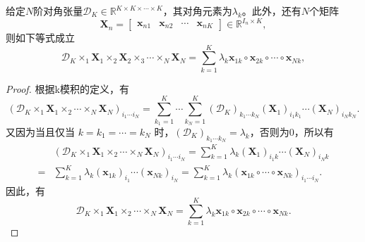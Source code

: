 \begin{property}\label{prop:diag-kron}
    给定\( N \)阶对角张量\( \mathcal{D}_K \in \mathbb{R}^{K \times K \times \cdots \times K} \)，其对角元素为\( \lambda_k \)。此外，还有\( N \)个矩阵
    \[
        \mathbf{X}_n = \begin{bmatrix}
            \bm{x}_{n1} & \bm{x}_{n2} & \cdots & \bm{x}_{nK}
        \end{bmatrix} \in \mathbb{R}^{I_n \times K},
    \]
    则如下等式成立
    \[
        \mathcal{D}_K \times_1 \mathbf{X}_1 \times_2 \mathbf{X}_2 \times_3 \cdots \times_N \mathbf{X}_N = \sum_{k=1}^K \lambda_k \bm{x}_{1k} \circ \bm{x}_{2k} \circ \cdots \circ \bm{x}_{Nk},
    \]
\end{property}
\begin{proof}
    根据k模积的定义，有
    \[
        \left( \mathcal{D}_K \times_1 \mathbf{X}_1 \times_2 \cdots \times_N \mathbf{X}_N \right)_{i_1 \cdots i_N} = \sum_{k_1=1}^{K}\cdots\sum_{k_N=1}^{K} (\mathcal{D}_K)_{k_1\cdots k_N} (\mathbf{X}_1)_{i_1 k_1} \cdots (\mathbf{X}_N)_{i_N k_N}.
    \]
    又因为当且仅当 $k = k_1=\cdots=k_N$ 时，$(\mathcal{D}_K)_{k_1\cdots k_N}=\lambda_{k}$，否则为0，所以有
    \[
        \begin{split}
              & \left( \mathcal{D}_K \times_1 \mathbf{X}_1 \times_2 \cdots \times_N \mathbf{X}_N \right)_{i_1 \cdots i_N} = \sum_{k=1}^{K} \lambda_k (\mathbf{X}_1)_{i_1 k} \cdots (\mathbf{X}_N)_{i_N k} \\
            = & \sum_{k=1}^{K} \lambda_k (\bm{x}_{1k})_{i_1} \cdots (\bm{x}_{Nk})_{i_N} = \sum_{k=1}^K \lambda_k \left( \bm{x}_{1k} \circ \cdots \circ \bm{x}_{Nk} \right)_{i_1 \cdots i_N}.
        \end{split}
    \]
    因此，有
    \[
        \mathcal{D}_K \times_1 \mathbf{X}_1 \times_2 \cdots \times_N \mathbf{X}_N = \sum_{k=1}^K \lambda_k \bm{x}_{1k} \circ \bm{x}_{2k} \circ \cdots \circ \bm{x}_{Nk}.
    \]
\end{proof}
